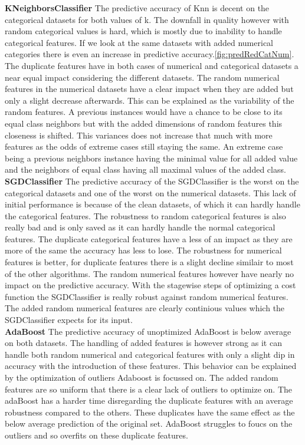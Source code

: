 \documentclass[a4paper,10pt]{article}
\begin{document}
\textbf{KNeighborsClassifier} The predictive accuracy of Knn is decent on the categorical datasets for both values of k. The downfall in quality however with random categorical values is hard, which is mostly due to inability to handle categorical features. If we look at the same datasets with added numerical categories there is even an increase in predictive accuracy.\ref{fig:predRedCatNum}.
The duplicate features have in both cases of numerical and categorical datasets a near equal impact considering the different datasets. The random numerical features in the numerical datasets have a clear impact when they are added but only a slight decrease afterwards. This can be explained as the variability of the random features. A previous instances would have a chance to be close to its equal class neighbors but with the added dimensions of random features this closeness is shifted. This variances does not increase that much with more features as the odds of extreme cases still staying the same. An extreme case being a previous neighbors instance having the minimal value for all added value and the neighbors of equal class having all maximal values of the added class. \\

\textbf{SGDClassifier} The predictive accuracy of the SGDClassifier is the worst on the categorical datasets and one of the worst on the numerical datasets. This lack of initial performance is because of the clean datasets, of which it can hardly handle the categorical features. The robustness to random categorical features is also really bad and is only saved as it can hardly handle the normal categorical features. The duplicate categorical features have a less of an impact as they are more of the same the accuracy has less to lose. The robustness for numerical features is better, for duplicate features there is a slight decline similair to most of the other algorithms. The random numerical features however have nearly no impact on the predictive accuracy. With the stagewise steps of optimizing a cost function the SGDClassifier is really robust against random numerical features. The added random numerical features are clearly continious values which the SGDClassifier expects for its input. \\

\textbf{AdaBoost} The predictive accuracy of unoptimized  AdaBoost is below average on both datasets. The handling of added features is however strong as it can handle both random numerical and categorical features with only a slight dip in accuracy with the introduction of these features. This behavior can be explained by the optimization of outliers Adaboost is focussed on. The added random features are so uniform that there is a clear lack of outliers to optimize on. The adaBoost has a harder time disregarding the duplicate features with an average robustness compared to the others. These duplicates have the same effect as the below average prediction of the original set. AdaBoost struggles to foucs on the outliers and so overfits on these  duplicate features.\\
\end{document}
